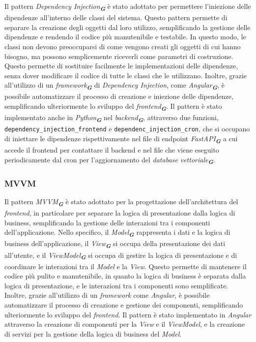 Il pattern \emph{Dependency Injection}\textsubscript{\textbf{\textit{G}}} è stato adottato per permettere l'iniezione delle dipendenze all'interno delle classi del sistema. Questo pattern permette di separare la creazione degli oggetti dal loro utilizzo, semplificando la gestione delle dipendenze e rendendo il codice più manutenibile e testabile. In questo modo, le classi non devono preoccuparsi di come vengono creati gli oggetti di cui hanno bisogno, ma possono semplicemente riceverli come parametri di costruzione. Questo permette di sostituire facilmente le implementazioni delle dipendenze, senza dover modificare il codice di tutte le classi che le utilizzano. Inoltre, grazie all'utilizzo di un \emph{framework}\textsubscript{\textbf{\textit{G}}} di \emph{Dependency Injection}, come \emph{Angular}\textsubscript{\textbf{\textit{G}}}, è possibile automatizzare il processo di creazione e iniezione delle dipendenze, semplificando ulteriormente lo sviluppo del \emph{frontend}\textsubscript{\textbf{\textit{G}}}. Il pattern è stato implementato anche in \emph{Python}\textsubscript{\textbf{\textit{G}}} nel \emph{backend}\textsubscript{\textbf{\textit{G}}}, attraverso due funzioni, \texttt{dependency\_injection\_frontend} e \texttt{dependenc\_injection\_cron}, che si occupano di iniettare le dipendenze rispettivamente nel file di endpoint \emph{FastAPI}\textsubscript{\textbf{\textit{G}}} a cui accede il frontend per contattare il backend e nel file che viene eseguito periodicamente dal cron per l'aggiornamento del \emph{database vettoriale}\textsubscript{\textbf{\textit{G}}}.


\subsubsection{MVVM}
\label{sec:mvvm}

Il pattern \emph{MVVM}\textsubscript{\textbf{\textit{G}}} è stato adottato per la progettazione dell'architettura del \emph{frontend}, in particolare per separare la logica di presentazione dalla logica di business, semplificando la gestione delle interazioni tra i componenti dell'applicazione. Nello specifico, il \emph{Model}\textsubscript{\textbf{\textit{G}}} rappresenta i dati e la logica di business dell'applicazione, il \emph{View}\textsubscript{\textbf{\textit{G}}} si occupa della presentazione dei dati all'utente, e il \emph{ViewModel}\textsubscript{\textbf{\textit{G}}} si occupa di gestire la logica di presentazione e di coordinare le interazioni tra il \emph{Model} e la \emph{View}. Questo permette di mantenere il codice più pulito e manutenibile, in quanto la logica di business è separata dalla logica di presentazione, e le interazioni tra i componenti sono semplificate. Inoltre, grazie all'utilizzo di un \emph{framework} come \emph{Angular}, è possibile automatizzare il processo di creazione e gestione dei componenti, semplificando ulteriormente lo sviluppo del \emph{frontend}. Il pattern è stato implementato in \emph{Angular} attraverso la creazione di componenti per la \emph{View} e il \emph{ViewModel}, e la creazione di servizi per la gestione della logica di business del \emph{Model}.



